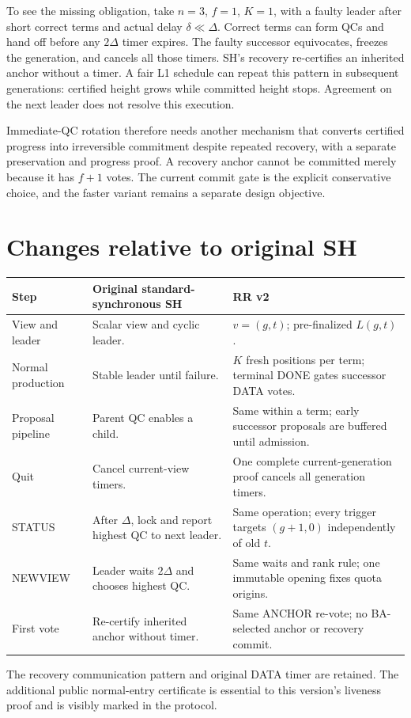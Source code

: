 \documentclass[11pt,a4paper]{article}
\newcounter{protocol}
\begin{document}
To see the missing obligation, take $n=3$, $f=1$, $K=1$, with a faulty
leader after short correct terms and actual delay $\delta\ll\Delta$.
Correct terms can form QCs and hand off before any $2\Delta$ timer expires.
The faulty successor equivocates, freezes the generation, and cancels
all those timers. SH's recovery re-certifies an inherited anchor without
a timer. A fair L1 schedule can repeat this pattern in subsequent
generations: certified height grows while committed height stops.
Agreement on the next leader does not resolve this execution.

Immediate-QC rotation therefore needs another mechanism that converts
certified progress into irreversible commitment despite repeated recovery,
with a separate preservation and progress proof. A recovery anchor cannot
be committed merely because it has $f+1$ votes. The current commit gate
is the explicit conservative choice, and the faster variant remains a
separate design objective.

\section{Changes relative to original SH}
\label{sec:diff}
\begin{center}\small
\begin{tabularx}{\linewidth}{@{}p{.22\linewidth}Y Y@{}}
\toprule
Step & Original standard-synchronous SH & RR v2\\
\midrule
View and leader & Scalar view and cyclic leader. &
$v=(g,t)$; pre-finalized $L(g,t)$.\\
Normal production & Stable leader until failure. &
$K$ fresh positions per term; terminal DONE gates successor DATA votes.\\
Proposal pipeline & Parent QC enables a child. &
Same within a term; early successor proposals are buffered until admission.\\
Quit & Cancel current-view timers. &
One complete current-generation proof cancels all generation timers.\\
STATUS & After $\Delta$, lock and report highest QC to next leader. &
Same operation; every trigger targets $(g+1,0)$ independently of old $t$.\\
NEWVIEW & Leader waits $2\Delta$ and chooses highest QC. &
Same waits and rank rule; one immutable opening fixes quota origins.\\
First vote & Re-certify inherited anchor without timer. &
Same ANCHOR re-vote; no BA-selected anchor or recovery commit.\\
\bottomrule
\end{tabularx}
\end{center}
The recovery communication pattern and original DATA timer are retained.
The additional public normal-entry certificate is essential to this
version's liveness proof and is visibly marked in the protocol.
\end{document}
